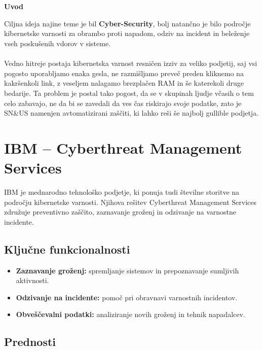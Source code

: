 \documentclass[a4paper,12pt]{article}
\begin{document}
\section{}\large{{\textbf{Uvod}}


Ciljna ideja najine teme je bil \textbf{Cyber-Security}, bolj natančno je bilo področje kibernetske varnosti za obrambo proti napadom, odziv na incident in beleženje vseh poskušenih vdorov v sisteme.\\
\\
Vedno hitreje postaja kibernetska varnost resničen izziv za veliko podjetij, saj vsi pogosto uporabljamo enaka gesla, ne razmišljamo preveč preden kliknemo na kakršenkoli link, z veseljem nalagamo brezplačen RAM in še katerekoli druge bedarije. Ta problem je postal tako pogost, da se v skupinah ljudje včasih o tem celo zabavajo, ne da bi se zavedali da ves čas riskirajo svoje podatke, zato je SN\&US namenjen avtomatizirani zaščiti, ki lahko reši še najbolj gullible podjetja.

\break


\section{IBM -- Cyberthreat Management Services}

IBM je mednarodno tehnološko podjetje, ki ponuja tudi številne storitve na področju kibernetske varnosti. Njihova rešitev Cyberthreat Management Services združuje preventivno zaščito, zaznavanje groženj in odzivanje na varnostne incidente.\cite{ibm}

\subsection{Ključne funkcionalnosti}

\begin{itemize}
    \item \textbf{Zaznavanje groženj:} spremljanje sistemov in prepoznavanje sumljivih aktivnosti.
    \item \textbf{Odzivanje na incidente:} pomoč pri obravnavi varnostnih incidentov.
    \item \textbf{Obveščevalni podatki:} analiziranje novih groženj in tehnik napadalcev.
\end{itemize}

\subsection{Prednosti}

}
\end{document}
